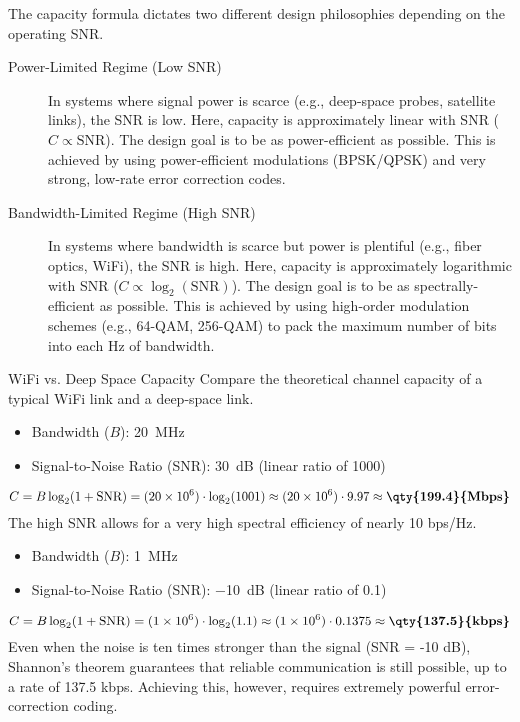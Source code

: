 The capacity formula dictates two different design philosophies depending on the operating SNR.

\begin{description}
    \item[Power-Limited Regime (Low SNR)] In systems where signal power is scarce (e.g., deep-space probes, satellite links), the SNR is low. Here, capacity is approximately linear with SNR ($C \propto \text{SNR}$). The design goal is to be as power-efficient as possible. This is achieved by using power-efficient modulations (BPSK/QPSK) and very strong, low-rate error correction codes.
    \item[Bandwidth-Limited Regime (High SNR)] In systems where bandwidth is scarce but power is plentiful (e.g., fiber optics, WiFi), the SNR is high. Here, capacity is approximately logarithmic with SNR ($C \propto \log_2(\text{SNR})$). The design goal is to be as spectrally-efficient as possible. This is achieved by using high-order modulation schemes (e.g., 64-QAM, 256-QAM) to pack the maximum number of bits into each Hz of bandwidth.
\end{description}


\begin{workedexample}{WiFi vs. Deep Space Capacity}
     Compare the theoretical channel capacity of a typical WiFi link and a deep-space link.
    
    \begin{itemize}
        \item Bandwidth ($B$): \qty{20}{MHz}
        \item Signal-to-Noise Ratio (SNR): \qty{30}{dB} (linear ratio of 1000)
    \end{itemize}
    \[ C = B \log_2(1 + \text{SNR}) = (20 \times 10^6) \cdot \log_2(1001) \approx (20 \times 10^6) \cdot 9.97 \approx \textbf{\qty{199.4}{Mbps}} \]
    The high SNR allows for a very high spectral efficiency of nearly 10 bps/Hz.

    \begin{itemize}
        \item Bandwidth ($B$): \qty{1}{MHz}
        \item Signal-to-Noise Ratio (SNR): \qty{-10}{dB} (linear ratio of 0.1)
    \end{itemize}
    \[ C = B \log_2(1 + \text{SNR}) = (1 \times 10^6) \cdot \log_2(1.1) \approx (1 \times 10^6) \cdot 0.1375 \approx \textbf{\qty{137.5}{kbps}} \]
     Even when the noise is ten times stronger than the signal (SNR = -10 dB), Shannon's theorem guarantees that reliable communication is still possible, up to a rate of 137.5 kbps. Achieving this, however, requires extremely powerful error-correction coding.
\end{workedexample}


